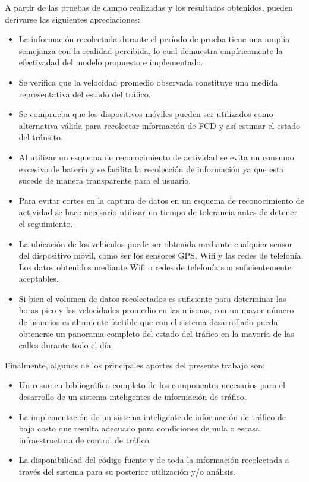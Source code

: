 A partir de las pruebas de campo realizadas y los resultados obtenidos, pueden derivarse las siguientes apreciaciones:
\begin{itemize}
\item La información recolectada durante el período de prueba tiene una amplia semejanza con la realidad percibida, lo cual demuestra empíricamente la efectivadad del modelo propuesto e implementado.
\item Se verifica que la velocidad promedio observada constituye una medida representativa del estado del tráfico.

\item Se comprueba que los dispositivos móviles pueden ser utilizados como alternativa válida para recolectar información de FCD y así estimar el estado del tránsito.

\item Al utilizar un esquema de reconocimiento de actividad se evita un consumo excesivo de batería y se facilita la recolección de información ya que esta sucede de manera transparente para el usuario.

\item Para evitar cortes en la captura de datos en un esquema de reconocimiento de actividad se hace necesario utilizar un tiempo de tolerancia antes de detener el seguimiento.

\item La ubicación de los vehículos puede ser obtenida mediante cualquier sensor del dispositivo móvil, como ser los sensores GPS, Wifi y las redes de telefonía. Los datos obtenidos mediante Wifi o redes de telefonía son suficientemente aceptables.

\item Si bien el volumen de datos recolectados es suficiente para determinar las horas pico y las velocidades promedio en las mismas, con un mayor número de usuarios es altamente factible que con el sistema desarrollado pueda obtenerse un panorama completo del estado del tráfico en la mayoría de las calles durante todo el día.
\end{itemize}

Finalmente, algunos de los principales aportes del presente trabajo son:

\begin{itemize}
\item Un resumen bibliográfico completo de los componentes necesarios para el desarrollo de un sistema inteligentes de información de tráfico.

\item La implementación de un sistema inteligente de información de tráfico de bajo costo que resulta adecuado para condiciones de nula o escasa infraestructura de control de tráfico.

\item La disponibilidad del código fuente y de toda la información recolectada a través del sistema para su posterior utilización y/o análisis.
\end{itemize}

